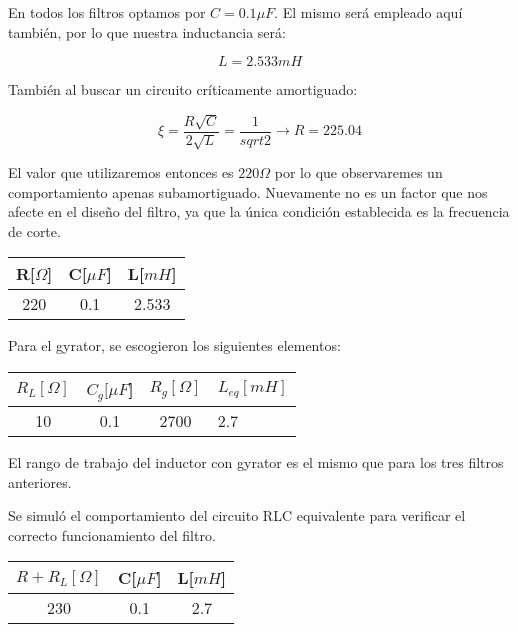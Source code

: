 En todos los filtros optamos por $C=0.1 \mu F$. El mismo será empleado aquí también, por lo que nuestra inductancia será:

$$L = 2.533 mH$$

También al buscar un circuito críticamente amortiguado:

$$\xi=\frac{R \sqrt{C}}{2\sqrt{L}}=\frac{1}{sqrt{2}} \longrightarrow R=225.04$$

El valor que utilizaremos entonces es $220 \Omega$ por lo que observaremes un comportamiento apenas subamortiguado.
Nuevamente no es un factor que nos afecte en el diseño del filtro, ya que la única condición establecida es la frecuencia
de corte.

\begin{table}[H]
    \centering
    \begin{tabular}{|c|c|c|}
    \hline
    \rowcolor[HTML]{C0C0C0} 
    R[$\Omega$] & C[$\mu F$] & L[$mH$]  \\ \hline
    220     & 0.1  & 2.533 \\ \hline
    \end{tabular}
    \end{table}

Para el gyrator, se escogieron los siguientes elementos:

\begin{table}[H]
    \centering
    \begin{tabular}{|c|c|c|l|}
    \hline
    \rowcolor[HTML]{C0C0C0} 
    $R_L[\Omega]$ & $C_g[\mu F$] & $R_g[\Omega]$  & $L_{eq}[mH]$ \\ \hline
    10      & 0.1  & 2700 & 2.7        \\ \hline
    \end{tabular}
    \end{table}

El rango de trabajo del inductor con gyrator es el mismo que para los tres filtros anteriores.

Se simuló el comportamiento del circuito RLC equivalente para verificar el correcto funcionamiento del filtro.

\begin{table}[H]
    \centering
    \begin{tabular}{|c|c|c|}
    \hline
    \rowcolor[HTML]{C0C0C0} 
    $R+R_L[\Omega]$ & C[$\mu F$] & L[$mH$]  \\ \hline
    230     & 0.1  & 2.7 \\ \hline
    \end{tabular}
    \end{table}



